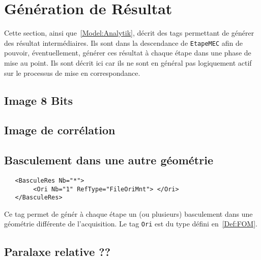 
\section{G\'en\'eration de R\'esultat}

Cette section, ainsi que~\ref{Model:Analytik},
d\'ecrit des tags permettant de g\'en\'erer des
r\'esultat interm\'ediaires. Ils sont dans la descendance
de {\tt EtapeMEC} afin de pouvoir, \'eventuellement,
g\'en\'erer ces r\'esultat \`a chaque \'etape dans une
phase de mise au point. Ils sont d\'ecrit ici car ils ne
sont en g\'en\'eral pas logiquement actif sur le processus
de mise en correspondance.


\subsection{Image 8 Bits}

\subsection{Image de corr\'elation}

\subsection{Basculement dans une autre g\'eom\'etrie}

\begin{verbatim}
   <BasculeRes Nb="*">                   
        <Ori Nb="1" RefType="FileOriMnt"> </Ori>
   </BasculeRes>
\end{verbatim}

Ce tag permet de g\'en\'er \`a chaque \'etape un (ou plusieurs) basculement
dans une g\'eom\'etrie diff\'erente de l'acquisition. Le tag {\tt Ori}
est du type d\'efini en~\ref{Def:FOM}.


\subsection{Paralaxe relative ??}


